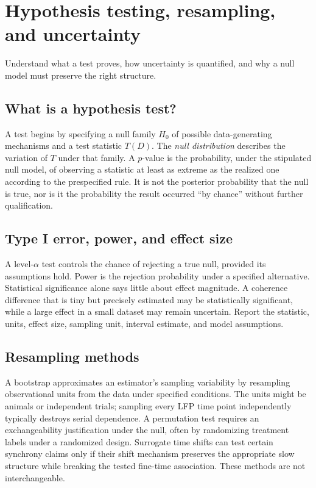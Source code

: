 \chapter{Hypothesis testing, resampling, and uncertainty}\label{ch:inference}
\begin{readergoal}Understand what a test proves, how uncertainty is quantified, and why a null model must preserve the right structure.\end{readergoal}
\section{What is a hypothesis test?}
A test begins by specifying a null family $H_0$ of possible data-generating mechanisms and a test statistic $T(D)$. The \emph{null distribution} describes the variation of $T$ under that family. A $p$-value is the probability, under the stipulated null model, of observing a statistic at least as extreme as the realized one according to the prespecified rule. It is not the posterior probability that the null is true, nor is it the probability the result occurred ``by chance'' without further qualification.

\section{Type I error, power, and effect size}
A level-$\alpha$ test controls the chance of rejecting a true null, provided its assumptions hold. Power is the rejection probability under a specified alternative. Statistical significance alone says little about effect magnitude. A coherence difference that is tiny but precisely estimated may be statistically significant, while a large effect in a small dataset may remain uncertain. Report the statistic, units, effect size, sampling unit, interval estimate, and model assumptions.

\section{Resampling methods}
A bootstrap approximates an estimator's sampling variability by resampling observational units from the data under specified conditions. The units might be animals or independent trials; sampling every LFP time point independently typically destroys serial dependence. A permutation test requires an exchangeability justification under the null, often by randomizing treatment labels under a randomized design. Surrogate time shifts can test certain synchrony claims only if their shift mechanism preserves the appropriate slow structure while breaking the tested fine-time association. These methods are not interchangeable.

